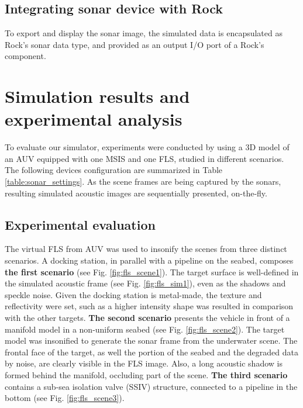 \documentclass[final,5p,times]{elsarticle}
\begin{document}
\subsection{Integrating sonar device with Rock}
\label{dev:rock}

To export and display the sonar image, the simulated data is encapsulated as Rock's sonar data type, and provided as an output I/O port of a Rock's component.


\section{Simulation results and experimental analysis}
\label{results}

To evaluate our simulator, experiments were conducted by using a 3D model of an AUV equipped with one MSIS and one FLS, studied in different scenarios. The following devices configuration are summarized in Table \ref{table:sonar_settings}. As the scene frames are being captured by the sonars, resulting simulated acoustic images are sequentially presented, on-the-fly.

\subsection{Experimental evaluation}

The virtual FLS from AUV was used to insonify the scenes from three distinct scenarios. A docking station, in parallel with a pipeline on the seabed, composes \textbf{the first scenario} (see Fig. \ref{fig:fls_scene1}). The target surface is well-defined in the simulated acoustic frame (see Fig. \ref{fig:fls_sim1}), even as the shadows and speckle noise. Given the docking station is metal-made, the texture and reflectivity were set, such as a higher intensity shape was resulted in comparison with the other targets. \textbf{The second scenario} presents the vehicle in front of a manifold model in a non-uniform seabed (see Fig. \ref{fig:fls_scene2}). The target model was insonified to generate the sonar frame from the underwater scene. The frontal face of the target, as well the portion of the seabed and the degraded data by noise, are clearly visible in the FLS image. Also, a long acoustic shadow is formed behind the manifold, occluding part of the scene. \textbf{The third scenario} contains a sub-sea isolation valve (SSIV) structure, connected to a pipeline in the bottom (see Fig. \ref{fig:fls_scene3}). 
\end{document}
